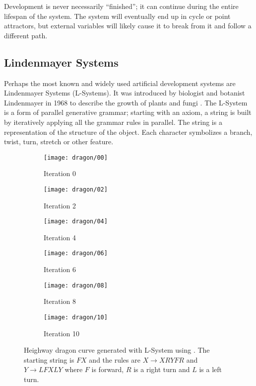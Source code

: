 Development is never necessarily ``finished''; it can continue during the entire lifespan of the system.
The system will eventually end up in cycle or point attractors, but external variables will likely cause it to break from it and follow a different path.

\subsection{Lindenmayer Systems}

Perhaps the most known and widely used artificial development systems are Lindenmayer Systems (L-Systems).
It was introduced by biologist and botanist Lindenmayer in 1968 to describe the growth of plants and fungi \cite{lindenmayer1968models}.
The L-System is a form of parallel generative grammar; starting with an axiom, a string is built by iteratively applying all the grammar rules in parallel.
The string is a representation of the structure of the object.
Each character symbolizes a branch, twist, turn, stretch or other feature.

\begin{figure}[!ht]
    \centering
    \begin{subfigure}{0.32\textwidth}
        \centering
        \texttt{[image: dragon/00]}
        \caption{Iteration 0}
    \end{subfigure}
    \begin{subfigure}{0.32\textwidth}
        \centering
        \texttt{[image: dragon/02]}
        \caption{Iteration 2}
    \end{subfigure}
    \begin{subfigure}{0.32\textwidth}
        \centering
        \texttt{[image: dragon/04]}
        \caption{Iteration 4}
    \end{subfigure}
    \par\bigskip
    \begin{subfigure}{0.32\textwidth}
        \centering
        \texttt{[image: dragon/06]}
        \caption{Iteration 6}
    \end{subfigure}
    \begin{subfigure}{0.32\textwidth}
        \centering
        \texttt{[image: dragon/08]}
        \caption{Iteration 8}
    \end{subfigure}
    \begin{subfigure}{0.32\textwidth}
        \centering
        \texttt{[image: dragon/10]}
        \caption{Iteration 10}
    \end{subfigure}
    \caption[Dragon curve]{
        Heighway dragon curve generated with L-System using \cite{lsystemgenerator}.
        The starting string is $FX$ and the rules are $X \rightarrow XRYFR$ and $Y \rightarrow LFXLY$ where $F$ is forward, $R$ is a right turn and $L$ is a left turn\footnotemark.
    }
    \label{fig:dragon-curve}
\end{figure}

